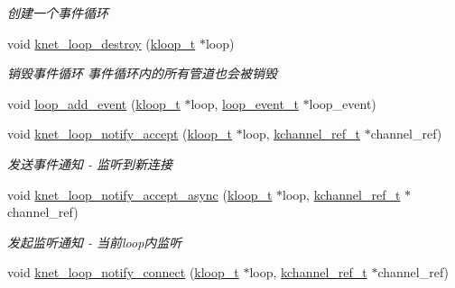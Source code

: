 \begin{DoxyCompactItemize}
\begin{DoxyCompactList}\small\item\em 创建一个事件循环 \end{DoxyCompactList}\item 
void \hyperlink{a00117_ga390ea3161f935d0d3a411df8752d8b9f_ga390ea3161f935d0d3a411df8752d8b9f}{knet\+\_\+loop\+\_\+destroy} (\hyperlink{a00056_a97fc76209a58362019f1ded9169e397f_a97fc76209a58362019f1ded9169e397f}{kloop\+\_\+t} $\ast$loop)
\begin{DoxyCompactList}\small\item\em 销毁事件循环 事件循环内的所有管道也会被销毁 \end{DoxyCompactList}\item 
void \hyperlink{a00076_a5ea05a43d50e68497c792f77cb112334_a5ea05a43d50e68497c792f77cb112334}{loop\+\_\+add\+\_\+event} (\hyperlink{a00056_a97fc76209a58362019f1ded9169e397f_a97fc76209a58362019f1ded9169e397f}{kloop\+\_\+t} $\ast$loop, \hyperlink{a00076_a1095ee772017ce29dcac0987c456709e_a1095ee772017ce29dcac0987c456709e}{loop\+\_\+event\+\_\+t} $\ast$loop\+\_\+event)
\item 
void \hyperlink{a00076_ab2829c911d0a52d4a59951cf2805c68c_ab2829c911d0a52d4a59951cf2805c68c}{knet\+\_\+loop\+\_\+notify\+\_\+accept} (\hyperlink{a00056_a97fc76209a58362019f1ded9169e397f_a97fc76209a58362019f1ded9169e397f}{kloop\+\_\+t} $\ast$loop, \hyperlink{a00056_a3b7e82599367eade261456f60ebe2cd9_a3b7e82599367eade261456f60ebe2cd9}{kchannel\+\_\+ref\+\_\+t} $\ast$channel\+\_\+ref)
\begin{DoxyCompactList}\small\item\em 发送事件通知 -\/ 监听到新连接 \end{DoxyCompactList}\item 
void \hyperlink{a00076_a3748a72ab4d7a23ee408d0cdf1fd1acb_a3748a72ab4d7a23ee408d0cdf1fd1acb}{knet\+\_\+loop\+\_\+notify\+\_\+accept\+\_\+async} (\hyperlink{a00056_a97fc76209a58362019f1ded9169e397f_a97fc76209a58362019f1ded9169e397f}{kloop\+\_\+t} $\ast$loop, \hyperlink{a00056_a3b7e82599367eade261456f60ebe2cd9_a3b7e82599367eade261456f60ebe2cd9}{kchannel\+\_\+ref\+\_\+t} $\ast$channel\+\_\+ref)
\begin{DoxyCompactList}\small\item\em 发起监听通知 -\/ 当前loop内监听 \end{DoxyCompactList}\item 
void \hyperlink{a00076_aed97725b0a9706543e9b31b604483740_aed97725b0a9706543e9b31b604483740}{knet\+\_\+loop\+\_\+notify\+\_\+connect} (\hyperlink{a00056_a97fc76209a58362019f1ded9169e397f_a97fc76209a58362019f1ded9169e397f}{kloop\+\_\+t} $\ast$loop, \hyperlink{a00056_a3b7e82599367eade261456f60ebe2cd9_a3b7e82599367eade261456f60ebe2cd9}{kchannel\+\_\+ref\+\_\+t} $\ast$channel\+\_\+ref)

\end{DoxyCompactItemize}
